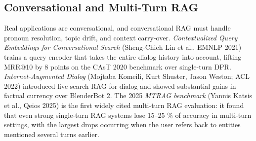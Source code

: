 \subsection{Conversational and Multi-Turn RAG}\label{conversational-and-multi-turn-rag}

Real applications are conversational, and conversational RAG must handle pronoun resolution, topic drift, and context carry-over. \emph{Contextualized Query Embeddings for Conversational Search} (Sheng-Chieh Lin et al., EMNLP 2021) trains a query encoder that takes the entire dialog history into account, lifting MRR@10 by 8 points on the CAsT 2020 benchmark over single-turn DPR. \emph{Internet-Augmented Dialog} (Mojtaba Komeili, Kurt Shuster, Jason Weston; ACL 2022) introduced live-search RAG for dialog and showed substantial gains in factual currency over BlenderBot 2. The 2025 \emph{MTRAG benchmark} (Yannis Katsis et al., Qeios 2025) is the first widely cited multi-turn RAG evaluation: it found that even strong single-turn RAG systems lose 15--25 \% of accuracy in multi-turn settings, with the largest drops occurring when the user refers back to entities mentioned several turns earlier.

